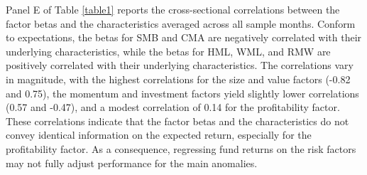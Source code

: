 Panel E of Table \ref{table1} reports the cross-sectional correlations between the factor betas and the characteristics averaged across all sample months. Conform to expectations, the betas for SMB and CMA are negatively correlated with their underlying characteristics, while the betas for HML, WML, and RMW are positively correlated with their underlying characteristics. The correlations vary in magnitude, with the highest correlations for the size and value factors (-0.82 and 0.75), the momentum and investment factors yield slightly lower correlations (0.57 and -0.47), and a modest correlation of 0.14 for the profitability factor. These correlations indicate that the factor betas and the characteristics do not convey identical information on the expected return, especially for the profitability factor. As a consequence, regressing fund returns on the risk factors may not fully adjust performance for the main anomalies.
 


